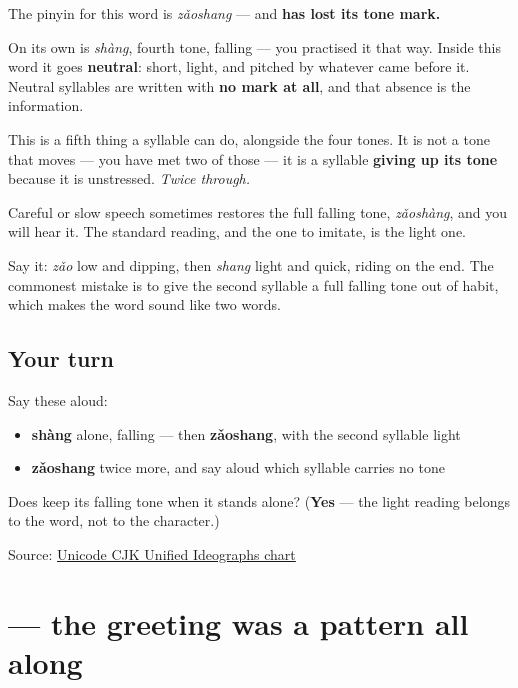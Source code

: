 \begin{sounds}
The pinyin for this word is \emph{zǎoshang} — and \textbf{ has lost its tone mark.}

On its own  is \emph{shàng}, fourth tone, falling — you practised it that way. Inside this word it goes \textbf{neutral}: short, light, and pitched by whatever came before it. Neutral syllables are written with \textbf{no mark at all}, and that absence is the information.

This is a fifth thing a syllable can do, alongside the four tones. It is not a tone that moves — you have met two of those — it is a syllable \textbf{giving up its tone} because it is unstressed. \emph{Twice through.}

Careful or slow speech sometimes restores the full falling tone, \emph{zǎoshàng}, and you will hear it. The standard reading, and the one to imitate, is the light one.

Say it: \emph{zǎo} low and dipping, then \emph{shang} light and quick, riding on the end. The commonest mistake is to give the second syllable a full falling tone out of habit, which makes the word sound like two words.
\end{sounds}

\subsection*{Your turn}
Say these aloud:

\begin{itemize}
\raggedright
  \item \textbf{shàng} alone, falling — then \textbf{zǎoshang}, with the second syllable light
  \item \textbf{zǎoshang} twice more, and say aloud which syllable carries no tone
\end{itemize}

\begin{tcolorbox}[breakable,colback=teal!4,colframe=teal!35!black,title={Before you move on}]
Does  keep its falling tone when it stands alone? (\textbf{Yes} — the light reading belongs to the word, not to the character.)

Source: \href{https://www.unicode.org/charts/PDF/U4E00.pdf}{Unicode CJK Unified Ideographs chart}
\end{tcolorbox}
\section[\texorpdfstring{\zh{早上好} (zǎoshang hǎo)}{早上好 (zǎoshang hǎo)}]{ — the greeting was a pattern all along}

